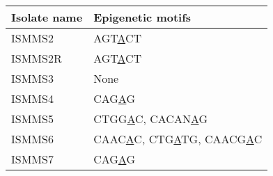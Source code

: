 \centering
\begin{tabular}{l l}
  \toprule
  Isolate name & Epigenetic motifs \\
  \midrule
  ISMMS2   & AGT\underline{A}CT \\
  ISMMS2R  & AGT\underline{A}CT \\
  ISMMS3   & None \\
  ISMMS4   & CAG\underline{A}G \\
  ISMMS5   & CTGG\underline{A}C, CACAN\underline{A}G \\
  ISMMS6   & CAAC\underline{A}C, CTG\underline{A}TG, CAACG\underline{A}C \\
  ISMMS7   & CAG\underline{A}G \\
  \bottomrule
\end{tabular}